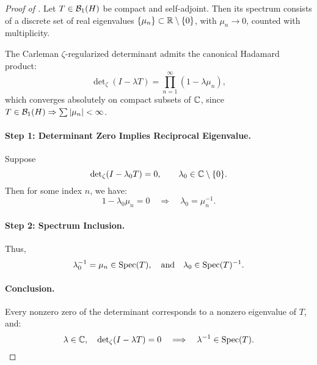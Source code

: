 \begin{proof}[Proof of ]
Let \( T \in \mathcal{B}_1(H) \) be compact and self-adjoint. Then its spectrum consists of a discrete set of real eigenvalues \( \{ \mu_n \} \subset \mathbb{R} \setminus \{0\} \), with \( \mu_n \to 0 \), counted with multiplicity.

The Carleman \(\zeta\)-regularized determinant admits the canonical Hadamard product:
\[
\det\nolimits_\zeta(I - \lambda T) = \prod_{n=1}^\infty (1 - \lambda \mu_n),
\]
which converges absolutely on compact subsets of \( \mathbb{C} \), since \( T \in \mathcal{B}_1(H) \Rightarrow \sum |\mu_n| < \infty \).

\paragraph{Step 1: Determinant Zero Implies Reciprocal Eigenvalue.}
Suppose
\[
\det\nolimits_\zeta(I - \lambda_0 T) = 0, \qquad \lambda_0 \in \mathbb{C} \setminus \{0\}.
\]
Then for some index \( n \), we have:
\[
1 - \lambda_0 \mu_n = 0 \quad \Longrightarrow \quad \lambda_0 = \mu_n^{-1}.
\]

\paragraph{Step 2: Spectrum Inclusion.}
Thus,
\[
\lambda_0^{-1} = \mu_n \in \operatorname{Spec}(T),
\quad \text{and} \quad \lambda_0 \in \operatorname{Spec}(T)^{-1}.
\]

\paragraph{Conclusion.}
Every nonzero zero of the determinant corresponds to a nonzero eigenvalue of \( T \), and:
\[
\lambda \in \mathbb{C}, \quad \det\nolimits_\zeta(I - \lambda T) = 0
\quad \Longrightarrow \quad
\lambda^{-1} \in \operatorname{Spec}(T).
\]
\end{proof}
